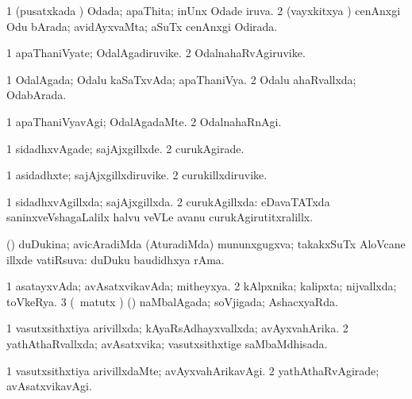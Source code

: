 {{\bentry
{} 
\gl{\gu}
\expl{}
\bmng
\bnum
\num{1} (pusatxkada \vi) Odada; apaThita; inUnx Odade iruva. 
\num{2} (vayxkitxya \vi) cenAnxgi Odu bArada; avidAyxvaMta; aSuTx cenAnxgi Odirada. 
\enum
\emng
\eentry

\bentry
{} 
\gl{\nA}
\expl{}
\bmng
\bnum
\num{1} apaThaniVyate; OdalAgadiruvike. 
\num{2} OdalnahaRvAgiruvike. 
\enum
\emng
\eentry

\bentry
{} 
\gl{\gu}
\expl{}
\bmng
\bnum
\num{1} OdalAgada; Odalu kaSaTxvAda; apaThaniVya. 
\num{2} Odalu ahaRvallxda; OdabArada. 
\enum
\emng
\eentry

\bentry
{} 
\gl{\kirxvi}
\expl{}
\bmng
\bnum
\num{1} apaThaniVyavAgi; OdalAgadaMte. 
\num{2} OdalnahaRnAgi. 
\enum
\emng
\eentry

\bentry
{} 
\gl{\kirxvi}
\expl{}
\bmng
\bnum
\num{1} sidadhxvAgade; sajAjxgillxde. 
\num{2} curukAgirade. 
\enum
\emng
\eentry

\bentry
{} 
\gl{\nA}
\expl{}
\bmng
\bnum
\num{1} asidadhxte; sajAjxgillxdiruvike. 
\num{2} curukillxdiruvike. 
\enum
\emng
\eentry

\bentry
{} 
\gl{\gu}
\expl{}
\bmng
\bnum
\num{1} sidadhxvAgillxda; sajAjxgillxda. 
\num{2} curukAgillxda:  eDavaTATxda saninxveVshagaLalilx halvu veVLe avanu curukAgirutitxralillx. 
\enum
\emng
\eentry

\bentry
{} 
\gl{\gu}
\expl{}
\bmng
(\pArxparx) duDukina; avicAradiMda (AturadiMda) mununxgugxva; takakxSuTx AloVcane illxde vatiRsuva:  duDuku baudidhxya rAma. 
\emng
\eentry

\bentry
{} 
\gl{\gu}
\expl{}
\bmng
\bnum
\num{1} asatayxvAda; avAsatxvikavAda; mitheyxya. 
\num{2} kAlpxnika; kalipxta; nijvallxda; toVkeRya. 
\num{3} (\ame\ matutx \AseTxrXV) (\ashi) naMbalAgada; soVjigada; AshacxyaRda. 
\enum
\emng
\eentry

\bentry
{} 
\gl{\gu}
\expl{}
\bmng
\bnum
\num{1} vasutxsithxtiya arivillxda; kAyaRsAdhayxvallxda; avAyxvahArika. 
\num{2} yathAthaRvallxda; avAsatxvika; vasutxsithxtige saMbaMdhisada. 
\enum
\emng
\eentry

\bentry
{} 
\gl{\kirxvi}
\expl{}
\bmng
\bnum
\num{1} vasutxsithxtiya arivillxdaMte; avAyxvahArikavAgi. 
\num{2} yathAthaRvAgirade; avAsatxvikavAgi. 
\enum
\emng
\eentry

}}
